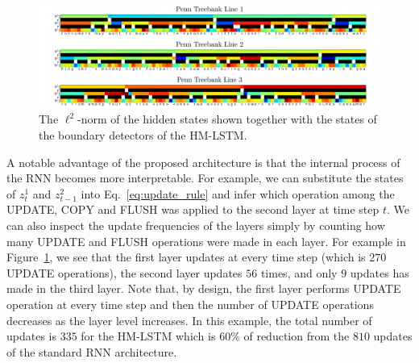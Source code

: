\documentclass{article} %
\begin{document}
\begin{figure}[t]
    \vspace*{-0.5cm}
	\hspace*{-2.5cm} 
	\begin{minipage}{1.2\columnwidth}
    	\centering
     	\includegraphics[width=1.1\columnwidth]{hidden_norm.pdf}
    \end{minipage}
    \caption{The $\ell^2$-norm of the hidden states shown together with the states of the boundary detectors of the HM-LSTM.}
    \label{fig:ptb_hidden} 
\end{figure}

A notable advantage of the proposed architecture is that the internal process of the RNN becomes more interpretable. 
For example, we can substitute the states of $z^1_t$ and $z^2_{t-1}$ into Eq.~\ref{eq:update_rule} 
and infer which operation among the UPDATE, COPY and FLUSH was applied to the second layer at time step $t$. 
We can also inspect the update frequencies of the layers simply by counting how many UPDATE and FLUSH operations were made in each layer. 
For example in Figure~\ref{fig:ptb_hidden}, we see that the first layer updates at every time step (which is $270$ UPDATE operations), 
the second layer updates $56$ times, and only $9$ updates has made in the third layer. 
Note that, by design, the first layer performs UPDATE operation at every time step and then the number of UPDATE operations decreases as the layer level increases. 
In this example, the total number of updates is $335$ for the HM-LSTM which is $60\%$ of reduction from the $810$ updates of the standard RNN architecture.
\end{document}
